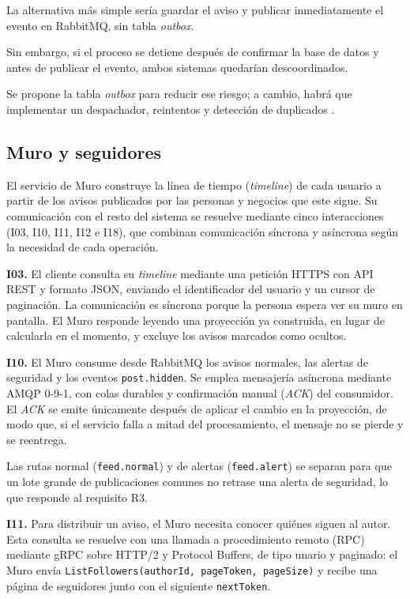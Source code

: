 \documentclass[12pt,a4paper]{article}
\begin{document}
La alternativa más simple sería guardar el aviso y publicar inmediatamente el evento en RabbitMQ, sin tabla \emph{outbox}.

Sin embargo, si el proceso se detiene después de confirmar la base de datos y antes de publicar el evento, ambos sistemas quedarían descoordinados.

Se propone la tabla \emph{outbox} para reducir ese riesgo; a cambio, habrá que implementar un despachador, reintentos y detección de duplicados \cite{schwarz2025outbox}.


\subsection{Muro y seguidores}

El servicio de Muro construye la línea de tiempo (\textit{timeline}) de cada
usuario a partir de los avisos publicados por las personas y negocios que este
sigue. Su comunicación con el resto del sistema se resuelve mediante cinco
interacciones (I03, I10, I11, I12 e I18), que combinan comunicación síncrona y
asíncrona según la necesidad de cada operación.

\textbf{I03.} El cliente consulta su \textit{timeline} mediante una petición
HTTPS con API REST y formato JSON, enviando el identificador del usuario y un
cursor de paginación. La comunicación es síncrona porque la persona espera ver
su muro en pantalla. El Muro responde leyendo una proyección ya construida, en
lugar de calcularla en el momento, y excluye los avisos marcados como ocultos.

\textbf{I10.} El Muro consume desde RabbitMQ los avisos normales, las alertas de
seguridad y los eventos \texttt{post.hidden}. Se emplea mensajería asíncrona
mediante AMQP 0-9-1, con colas durables y confirmación manual (\textit{ACK})
del consumidor. El \textit{ACK} se emite únicamente después de aplicar el
cambio en la proyección, de modo que, si el servicio falla a mitad del
procesamiento, el mensaje no se pierde y se reentrega. 

Las rutas normal (\texttt{feed.normal}) y de alertas (\texttt{feed.alert}) se separan para que un lote grande de publicaciones comunes no retrase una alerta de seguridad, lo que responde al requisito R3.

\textbf{I11.} Para distribuir un aviso, el Muro necesita conocer quiénes siguen
al autor. Esta consulta se resuelve con una llamada a procedimiento remoto
(RPC) mediante gRPC sobre HTTP/2 y Protocol Buffers, de tipo unario y
paginado: el Muro envía \texttt{ListFollowers(authorId, pageToken, pageSize)} y
recibe una página de seguidores junto con el siguiente \texttt{nextToken}. 
\end{document}
